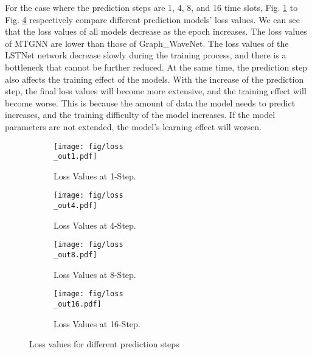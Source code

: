\documentclass[journal]{IEEEtran}
\begin{document}
For the case where the prediction steps are 1, 4, 8, and 16 time slots, Fig. \ref{fig11} to Fig. \ref{fig14} respectively compare different prediction models' loss values. We can see that the loss values of all models decrease as the epoch increases. The loss values of MTGNN are lower than those of Graph\_WaveNet. The loss values of the LSTNet network decrease slowly during the training process, and there is a bottleneck that cannot be further reduced. At the same time, the prediction step also affects the training effect of the models. With the increase of the prediction step, the final loss values will become more extensive, and the training effect will become worse. This is because the amount of data the model needs to predict increases, and the training difficulty of the model increases. If the model parameters are not extended, the model's learning effect will worsen.


\begin{figure}[htbp] %
    \centering %
    \begin{subfigure}[b]{0.24\textwidth} %
        \texttt{[image: fig/loss\\\_out1.pdf]} %
        \caption{Loss Values at 1-Step.} %
        \label{fig11} %
    \end{subfigure}  
    \hfill %
    \begin{subfigure}[b]{0.24\textwidth}  
        \texttt{[image: fig/loss\\\_out4.pdf]}  
        \caption{Loss Values at 4-Step.}  
        \label{fig12}  
    \end{subfigure}  
      
    \hfill       
    \begin{subfigure}[b]{0.24\textwidth}  
        \texttt{[image: fig/loss\\\_out8.pdf]}  
        \caption{Loss Values at 8-Step.}  
        \label{fig13}  
    \end{subfigure}  
    \hfill  
    \begin{subfigure}[b]{0.24\textwidth}  
        \texttt{[image: fig/loss\\\_out16.pdf]}  
        \caption{Loss Values at 16-Step.}  
        \label{fig14}  
    \end{subfigure}  
      
    \caption{Loss values for different prediction steps} %
    \label{fig:main} %
\end{figure}
\end{document}
